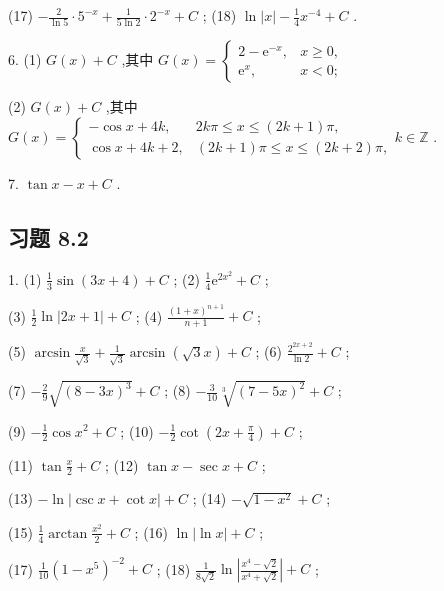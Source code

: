 (17) \(- \frac{2}{\ln 5} \cdot  {5}^{-x} + \frac{1}{5\ln 2} \cdot  {2}^{-x} + C\) ; (18) \(\ln \left| x\right|  - \frac{1}{4}{x}^{-4} + C\) .

6. (1) \(G\left( x\right)  + C\) ,其中 \(G\left( x\right)  = \left\{  \begin{array}{ll} 2 - {\mathrm{e}}^{-x}, & x \geq  0, \\  {\mathrm{e}}^{x}, & x < 0; \end{array}\right.\)

(2) \(G\left( x\right)  + C\) ,其中 \(G\left( x\right)  = \left\{  {\begin{array}{ll}  - \cos x + {4k}, & {2k\pi } \leq  x \leq  \left( {{2k} + 1}\right) \pi , \\  \cos x + {4k} + 2, & \left( {{2k} + 1}\right) \pi  \leq  x \leq  \left( {{2k} + 2}\right) \pi , \end{array}k \in  \mathbb{Z}}\right.\) .

7. \(\tan x - x + C\) .

\subsection{习题 8.2}

1. (1) \(\frac{1}{3}\sin \left( {{3x} + 4}\right)  + C\) ; (2) \(\frac{1}{4}{\mathrm{e}}^{2{x}^{2}} + C\) ;

(3) \(\frac{1}{2}\ln \left| {{2x} + 1}\right|  + C\) ; (4) \(\frac{{\left( 1 + x\right) }^{n + 1}}{n + 1} + C\) ;

(5) \(\arcsin \frac{x}{\sqrt{3}} + \frac{1}{\sqrt{3}}\arcsin \left( {\sqrt{3}x}\right)  + C\) ; (6) \(\frac{{2}^{{2x} + 2}}{\ln 2} + C\) ;

(7) \(- \frac{2}{9}\sqrt{{\left( 8 - 3x\right) }^{3}} + C\) ; (8) \(- \frac{3}{10}\sqrt[3]{{\left( 7 - 5x\right) }^{2}} + C\) ;

(9) \(- \frac{1}{2}\cos {x}^{2} + C\) ; (10) \(- \frac{1}{2}\cot \left( {{2x} + \frac{\pi }{4}}\right)  + C\) ;

(11) \(\tan \frac{x}{2} + C\) ; (12) \(\tan x - \sec x + C\) ;

(13) \(- \ln \left| {\csc x + \cot x}\right|  + C\) ; (14) \(- \sqrt{1 - {x}^{2}} + C\) ;

(15) \(\frac{1}{4}\arctan \frac{{x}^{2}}{2} + C\) ; (16) \(\ln \left| {\ln x}\right|  + C\) ;

(17) \(\frac{1}{10}{\left( 1 - {x}^{5}\right) }^{-2} + C\) ; (18) \(\frac{1}{8\sqrt{2}}\ln \left| \frac{{x}^{4} - \sqrt{2}}{{x}^{4} + \sqrt{2}}\right|  + C\) ;

